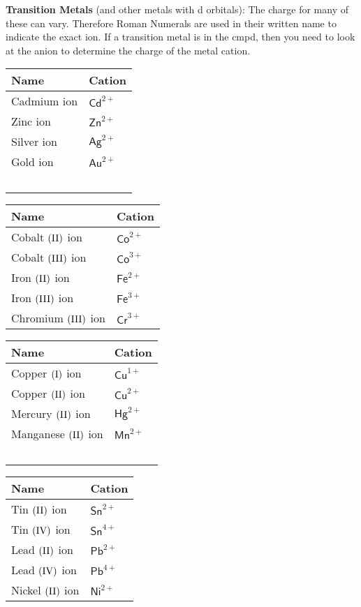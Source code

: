 \documentclass{article}
\theoremstyle{mytheoremstyle}
\theoremstyle{mytheoremstyle}
\theoremstyle{myproblemstyle}
\begin{document}
\textbf{Transition Metals} (and other metals with d orbitals): The charge for many of these can vary. Therefore Roman Numerals are used in their written name to indicate the exact ion. If a transition metal is in the cmpd, then you need to look at the anion to determine the charge of the metal cation.

\begin{tabular}{ll}
    \textbf{Name} & \textbf{Cation} \\
    \hline
    Cadmium ion & \(\mathsf {Cd}^{2+}\) \\
    Zinc ion    & \(\mathsf {Zn}^{2+}\) \\
    Silver ion  & \(\mathsf {Ag}^{2+}\) \\
    Gold ion    & \(\mathsf {Au}^{2+}\) \\
    ~           &                 \\
\end{tabular}
\begin{tabular}{ll}
    \textbf{Name} & \textbf{Cation} \\
    \hline
    Cobalt \(\rm(II)\) ion    & \(\mathsf {Co}^{2+}\) \\
    Cobalt \(\rm(III)\) ion   & \(\mathsf {Co}^{3+}\) \\
    Iron \(\rm(II)\) ion      & \(\mathsf {Fe}^{2+}\) \\
    Iron \(\rm(III)\) ion     & \(\mathsf {Fe}^{3+}\) \\
    Chromium \(\rm(III)\) ion & \(\mathsf {Cr}^{3+}\) \\
\end{tabular}


\begin{tabular}{ll}
    \textbf{Name} & \textbf{Cation} \\
    \hline
    Copper \(\rm(I)\) ion     & \(\mathsf {Cu}^{1+}\) \\
    Copper \(\rm(II)\) ion    & \(\mathsf {Cu}^{2+}\) \\
    Mercury \(\rm(II)\) ion   & \(\mathsf {Hg}^{2+}\) \\
    Manganese \(\rm(II)\) ion & \(\mathsf {Mn}^{2+}\) \\
    ~                       &                 \\
\end{tabular}
\begin{tabular}{ll}
    \textbf{Name} & \textbf{Cation} \\
    \hline
    Tin \(\rm(II)\) ion    & \(\mathsf {Sn}^{2+}\) \\
    Tin \(\rm(IV)\) ion    & \(\mathsf {Sn}^{4+}\) \\
    Lead \(\rm(II)\) ion   & \(\mathsf {Pb}^{2+}\) \\
    Lead \(\rm(IV)\) ion   & \(\mathsf {Pb}^{4+}\) \\
    Nickel \(\rm(II)\) ion & \(\mathsf {Ni}^{2+}\) \\
\end{tabular}
\end{document}
